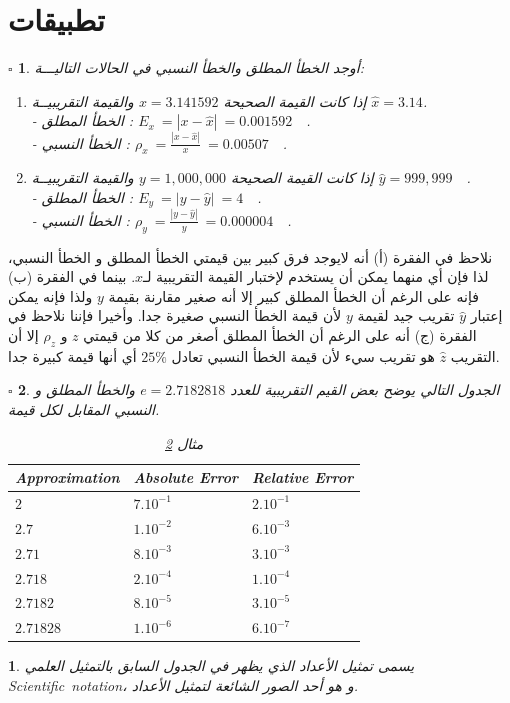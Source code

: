 \documentclass[a4 paper]{report}
\theoremstyle{mystyle}
\newtheorem{example}{$\square$ \arabicfonttt{\underline{مثال}}}[chapter]
\newtheorem{note}{\SquareShadowB\arabicfonttt {\underline{ ملاحظـة }}}[chapter]
\theoremstyle{Excercises}
\newcommand{\eng}{\textenglish}  %
\begin{document}
\section{تطبيقات}
\begin{example}\label{eg1}
أوجد الخطأ المطلق والخطأ النسبي\cite{Beucher} في الحالات التاليـــة:
\begin{enumerate}
\item[أ -] إذا كانت القيمة الصحيحة $x = 3.141592$ والقيمة التقريبيــة $\hat{x} = 3.14$.\\
- الخطأ المطلق : $E_x \:= | x - \hat{x}| \: = 0.001592\quad $.\\
- الخطأ النسبي : $\rho_x \:= \frac{| x - \hat{x}|}{x} \: = 0.00507\quad $.
\item[ب -] إذا كانت القيمة الصحيحة $y = 1,000,000$ والقيمة التقريبيــة $\hat{y} = 999,999\quad $.\\
- الخطأ المطلق : $E_y \:= | y - \hat{y}| \: = 4\quad $.\\
- الخطأ النسبي : $\rho_y \:= \frac{| y - \hat{y}|}{y} \: = 0.000004\quad $.
\end{enumerate}
\end{example}
نلاحظ في الفقرة (أ) أنه لايوجد فرق كبير بين قيمتي الخطأ المطلق و الخطأ النسبي، لذا فإن أي منهما يمكن أن يستخدم لإختبار القيمة التقريبية لـ$x$. بينما في الفقرة (ب) فإنه على الرغم أن الخطأ المطلق كبير إلا أنه صغير مقارنة بقيمة $y$ ولذا فإنه يمكن إعتبار $\hat{y}$ تقريب جيد لقيمة $y$ لأن قيمة الخطأ النسبي صغيرة جدا. وأخيرا فإننا نلاحظ في الفقرة (ج) أنه على الرغم أن الخطأ المطلق أصغر من كلا من قيمتي $z$ و $\rho_z$ إلا أن التقريب  $\hat{z}$ هو تقريب سيء لأن قيمة الخطأ النسبي تعادل $25\%$ أي أنها قيمة كبيرة جدا.
\begin{example}\label{eg2}
الجدول التالي يوضح بعض القيم التقريبية للعدد $e = 2.7182818$ والخطأ المطلق و النسبي المقابل لكل قيمة.
\
\begin{table}[hhh!]
\centering
\begin{tabular}{|p{2.5cm}|p{2.5cm}|p{2.5cm}|}
\hline		
Approximation & Absolute Error & Relative Error \\
\hline			
$2$&$7.10^{-1}$&$2.10^{-1}$\\
$2.7$&$1.10^{-2}$& $6.10^{-3}$\\
$2.71$&$8.10^{-3}$& $3.10^{-3}$\\
$2.718$&$2.10^{-4}$& $1.10^{-4}$\\
$2.7182$&$8.10^{-5}$& $3.10^{-5}$\\
$2.71828$&$1.10^{-6}$& $6.10^{-7}$\\
\hline		
\end{tabular}

\caption{مثال  \protect \ref{eg2}}
\end{table}
\end{example}
\begin{note}\label{note 1}
 يسمى تمثيل الأعداد الذي يظهر في الجدول السابق بالتمثيل العلمي \eng{Scientific~notation}، و هو أحد الصور الشائعة لتمثيل الأعداد. 
\end{note}
\end{document}
